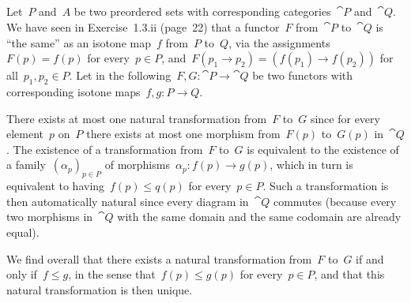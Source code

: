 \subsection{}

Let~$P$ and~$A$ be two preordered sets with corresponding categories~$\cat{P}$ and~$\cat{Q}$.
We have seen in Exercise~1.3.ii (page~22) that a functor~$F$ from~$\cat{P}$ to~$\cat{Q}$ is \enquote{the same} as an isotone map~$f$ from~$P$ to~$Q$, via the assignments~$F(p) = f(p)$ for every~$p ∈ P$, and~$F(p_1 \to p_2) = (f(p_1) \to f(p_2))$ for all~$p_1, p_2 ∈ P$.
Let in the following~$F, G \colon \cat{P} \to \cat{Q}$ be two functors with corresponding isotone maps~$f, g \colon P \to Q$.

There exists at most one natural transformation from~$F$ to~$G$ since for every element~$p$ on~$P$ there exists at most one morphism from~$F(p)$ to~$G(p)$ in~$\cat{Q}$.
The existence of a transformation from~$F$ to~$G$ is equivalent to the existence of a family~$(α_p)_{p ∈ P}$ of morphisms~$α_p \colon f(p) \to g(p)$, which in turn is equivalent to having~$f(p) ≤ q(p)$ for every~$p ∈ P$.
Such a transformation is then automatically natural since every diagram in~$\cat{Q}$ commutes (because every two morphisms in~$\cat{Q}$ with the same domain and the same codomain are already equal).

We find overall that there exists a natural transformation from~$F$ to~$G$ if and only if~$f ≤ g$, in the sense that~$f(p) ≤ g(p)$ for every~$p ∈ P$, and that this natural transformation is then unique.
